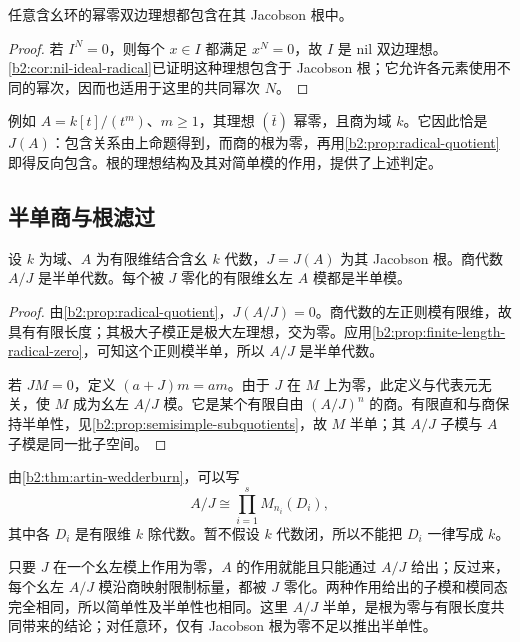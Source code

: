 \begin{proposition}\label{b2:prop:nilpotent-ideal-in-radical}
	任意含幺环的幂零双边理想都包含在其 Jacobson 根中。
\end{proposition}
\begin{proof}
	若 \(I^N=0\)，则每个 \(x\in I\) 都满足 \(x^N=0\)，故 \(I\) 是 nil 双边理想。\cref{b2:cor:nil-ideal-radical}已证明这种理想包含于 Jacobson 根；它允许各元素使用不同的幂次，因而也适用于这里的共同幂次 \(N\)。
\end{proof}

例如 \(A=k[t]/(t^m)\)、\(m\ge1\)，其理想 \((\bar t)\) 幂零，且商为域 \(k\)。它因此恰是 \(J(A)\)：包含关系由上命题得到，而商的根为零，再用\cref{b2:prop:radical-quotient}即得反向包含。根的理想结构及其对简单模的作用，提供了上述判定。

\subsection{半单商与根滤过}
\label{b2:subsec:1501:02}

\begin{proposition}\label{b2:prop:finite-algebra-semisimple-quotient}
	设 \(k\) 为域、\(A\) 为有限维结合含幺 \(k\) 代数，\(J=J(A)\) 为其 Jacobson 根。商代数 \(A/J\) 是半单代数。每个被 \(J\) 零化的有限维幺左 \(A\) 模都是半单模。
\end{proposition}
\begin{proof}
	由\cref{b2:prop:radical-quotient}，\(J(A/J)=0\)。商代数的左正则模有限维，故具有有限长度；其极大子模正是极大左理想，交为零。应用\cref{b2:prop:finite-length-radical-zero}，可知这个正则模半单，所以 \(A/J\) 是半单代数。

	若 \(JM=0\)，定义 \((a+J)m=am\)。由于 \(J\) 在 \(M\) 上为零，此定义与代表元无关，使 \(M\) 成为幺左 \(A/J\) 模。它是某个有限自由 \((A/J)^n\) 的商。有限直和与商保持半单性，见\cref{b2:prop:semisimple-subquotients}，故 \(M\) 半单；其 \(A/J\) 子模与 \(A\) 子模是同一批子空间。
\end{proof}

由\cref{b2:thm:artin-wedderburn}，可以写
\begin{equation}\label{b2:eq:finite-algebra-semisimple-quotient}
	A/J\cong\prod_{i=1}^s M_{n_i}(D_i),
\end{equation}
其中各 \(D_i\) 是有限维 \(k\) 除代数。暂不假设 \(k\) 代数闭，所以不能把 \(D_i\) 一律写成 \(k\)。

\ProseParagraphBreak
只要 \(J\) 在一个幺左模上作用为零，\(A\) 的作用就能且只能通过 \(A/J\) 给出；反过来，每个幺左 \(A/J\) 模沿商映射限制标量，都被 \(J\) 零化。两种作用给出的子模和模同态完全相同，所以简单性及半单性也相同。这里 \(A/J\) 半单，是根为零与有限长度共同带来的结论；对任意环，仅有 Jacobson 根为零不足以推出半单性。

